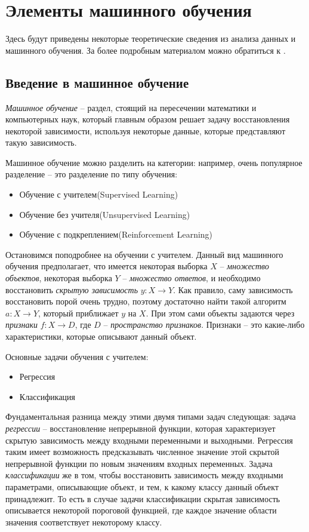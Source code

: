 \section{Элементы машинного обучения} 
Здесь будут приведены некоторые теоретические сведения из анализа данных и машинного обучения. За более подробным материалом можно обратиться к \cite{bishop, mathforml}.

\subsection{Введение в машинное обучение}
{\it Машинное обучение} -- раздел, стоящий на пересечении математики и компьютерных наук, который главным образом решает задачу восстановления некоторой зависимости, используя некоторые данные, которые представляют такую зависимость. 

Машинное обучение можно разделить на категории: например, очень популярное разделение -- это разделение по типу обучения:
\begin{itemize}
	\item Обучение с учителем(Supervised Learning)
	\item Обучение без учителя(Unsupervised Learning)
	\item Обучение с подкреплением(Reinforcement Learning)
\end{itemize}

Остановимся поподробнее на обучении с учителем. Данный вид машинного обучения предполагает, что имеется некоторая выборка $X$ -- {\it множество объектов}, некоторая выборка $Y$ -- {\it множество ответов}, и необходимо восстановить {\it скрытую зависимость} $y: X \to Y$. Как правило, саму зависимость восстановить порой очень трудно, поэтому достаточно найти такой алгоритм $a: X \to Y$, который приближает $y$ на $X$. При этом сами объекты задаются через {\it признаки} $f: X \to D$, где $D$ -- {\it пространство признаков}. Признаки -- это какие-либо характеристики, которые описывают данный объект. 

Основные задачи обучения с учителем:
\begin{itemize}
	\item Регрессия
	\item Классификация
\end{itemize}

Фундаментальная разница между этими двумя типами задач следующая: задача {\it регрессии} -- восстановление непрерывной функции, которая характеризует скрытую зависимость между входными переменными и выходными. Регрессия таким имеет возможность предсказывать численное значение этой скрытой непрерывной функции по новым значениям входных переменных. Задача {\it классификации} же в том, чтобы восстановить зависимость между входными параметрами, описывающие объект, и тем, к какому классу данный объект принадлежит. То есть в случае задачи классификации скрытая зависимость описывается некоторой пороговой функцией, где каждое значение области значения соответствует некоторому классу.

